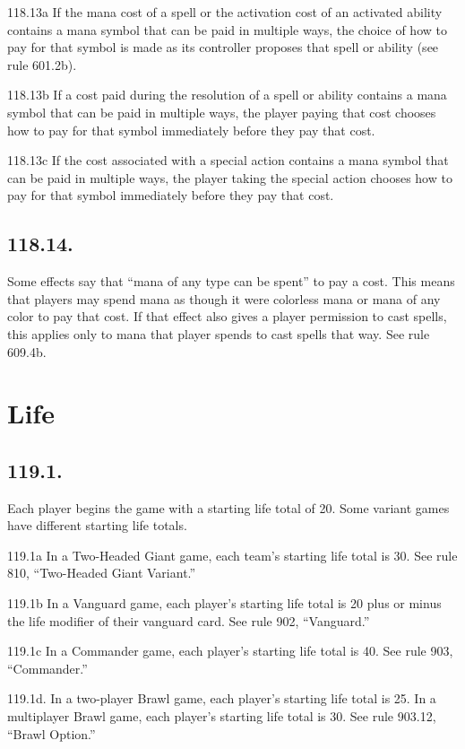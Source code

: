 118.13a If the mana cost of a spell or the activation cost of an activated ability contains a mana symbol that can be paid in multiple ways, the choice of how to pay for that symbol is made as its controller proposes that spell or ability (see rule 601.2b).

118.13b If a cost paid during the resolution of a spell or ability contains a mana symbol that can be paid in multiple ways, the player paying that cost chooses how to pay for that symbol immediately before they pay that cost.

118.13c If the cost associated with a special action contains a mana symbol that can be paid in multiple ways, the player taking the special action chooses how to pay for that symbol immediately before they pay that cost.

\subsection*{118.14.}
Some effects say that “mana of any type can be spent” to pay a cost. This means that players may spend mana as though it were colorless mana or mana of any color to pay that cost. If that effect also gives a player permission to cast spells, this applies only to mana that player spends to cast spells that way. See rule 609.4b.

\section{Life}
\subsection*{119.1.}
Each player begins the game with a starting life total of 20. Some variant games have different starting life totals.

119.1a In a Two-Headed Giant game, each team’s starting life total is 30. See rule 810, “Two-Headed Giant Variant.”

119.1b In a Vanguard game, each player’s starting life total is 20 plus or minus the life modifier of their vanguard card. See rule 902, “Vanguard.”

119.1c In a Commander game, each player’s starting life total is 40. See rule 903, “Commander.”

119.1d. In a two-player Brawl game, each player’s starting life total is 25. In a multiplayer Brawl game, each player’s starting life total is 30. See rule 903.12, “Brawl Option.”


